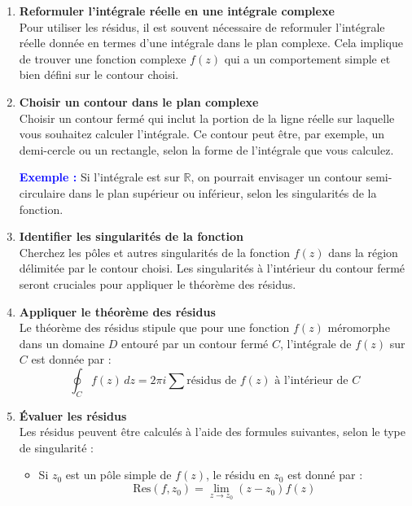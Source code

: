 \documentclass[a4paper,11pt]{article}
\begin{document}
\begin{enumerate}
    \item \textbf{Reformuler l'intégrale réelle en une intégrale complexe} \\
    Pour utiliser les résidus, il est souvent nécessaire de reformuler l'intégrale réelle donnée en termes d'une intégrale dans le plan complexe. Cela implique de trouver une fonction complexe \( f(z) \) qui a un comportement simple et bien défini sur le contour choisi.

    \item \textbf{Choisir un contour dans le plan complexe} \\
    Choisir un contour fermé qui inclut la portion de la ligne réelle sur laquelle vous souhaitez calculer l'intégrale. Ce contour peut être, par exemple, un demi-cercle ou un rectangle, selon la forme de l'intégrale que vous calculez.
    
    \textcolor{blue}{\textbf{Exemple :}} Si l'intégrale est sur \( \mathbb{R} \), on pourrait envisager un contour semi-circulaire dans le plan supérieur ou inférieur, selon les singularités de la fonction.

    \item \textbf{Identifier les singularités de la fonction} \\
    Cherchez les pôles et autres singularités de la fonction \( f(z) \) dans la région délimitée par le contour choisi. Les singularités à l'intérieur du contour fermé seront cruciales pour appliquer le théorème des résidus.

    \item \textbf{Appliquer le théorème des résidus} \\
    Le théorème des résidus stipule que pour une fonction \( f(z) \) méromorphe dans un domaine \( D \) entouré par un contour fermé \( C \), l'intégrale de \( f(z) \) sur \( C \) est donnée par :
    \[
    \oint_C f(z) \, dz = 2\pi i \sum \text{résidus de } f(z) \text{ à l’intérieur de } C
    \]

    \item \textbf{Évaluer les résidus} \\
    Les résidus peuvent être calculés à l'aide des formules suivantes, selon le type de singularité :
    \begin{itemize}
        \item Si \( z_0 \) est un pôle simple de \( f(z) \), le résidu en \( z_0 \) est donné par :
        \[
        \text{Res}(f, z_0) = \lim_{z \to z_0} (z - z_0) f(z)
        \]
        

\end{itemize}
\end{enumerate}
\end{document}
